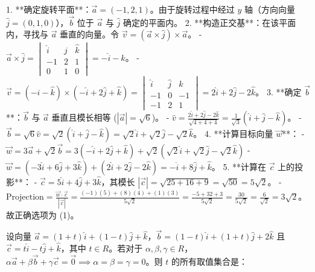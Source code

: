 \begin{questions}
\begin{solution}
1. **确定旋转平面**：$\vec{a} = (-1, 2, 1)$。由于旋转过程中经过 $y$ 轴（方向向量 $\hat{j} = (0, 1, 0)$），$\vec{b}$ 位于 $\vec{a}$ 与 $\hat{j}$ 确定的平面内。
2. **构造正交基**：在该平面内，寻找与 $\vec{a}$ 垂直的向量。令 $\vec{v} = (\vec{a} \times \hat{j}) \times \vec{a}$。
   - $\vec{a} \times \hat{j} = \begin{vmatrix} \hat{i} & \hat{j} & \hat{k} \\ -1 & 2 & 1 \\ 0 & 1 & 0 \end{vmatrix} = -\hat{i} - \hat{k}$。
   - $\vec{v} = (-\hat{i} - \hat{k}) \times (-\hat{i} + 2\hat{j} + \hat{k}) = \begin{vmatrix} \hat{i} & \hat{j} & \hat{k} \\ -1 & 0 & -1 \\ -1 & 2 & 1 \end{vmatrix} = 2\hat{i} + 2\hat{j} - 2\hat{k}$。
3. **确定 $\vec{b}$**：$\vec{b}$ 与 $\vec{a}$ 垂直且模长相等 ($|\vec{a}| = \sqrt{6}$)。
   - $\hat{v} = \frac{2\hat{i} + 2\hat{j} - 2\hat{k}}{\sqrt{4+4+4}} = \frac{1}{\sqrt{3}}(\hat{i} + \hat{j} - \hat{k})$。
   - $\vec{b} = \sqrt{6} \hat{v} = \sqrt{2}(\hat{i} + \hat{j} - \hat{k}) = \sqrt{2}\hat{i} + \sqrt{2}\hat{j} - \sqrt{2}\hat{k}$。
4. **计算目标向量 $\vec{w}$**：
   - $\vec{w} = 3\vec{a} + \sqrt{2}\vec{b} = 3(-\hat{i} + 2\hat{j} + \hat{k}) + \sqrt{2}(\sqrt{2}\hat{i} + \sqrt{2}\hat{j} - \sqrt{2}\hat{k})$
   - $\vec{w} = (-3\hat{i} + 6\hat{j} + 3\hat{k}) + (2\hat{i} + 2\hat{j} - 2\hat{k}) = -\hat{i} + 8\hat{j} + \hat{k}$。
5. **计算在 $\vec{c}$ 上的投影**：
   - $\vec{c} = 5\hat{i} + 4\hat{j} + 3\hat{k}$，其模长 $|\vec{c}| = \sqrt{25 + 16 + 9} = \sqrt{50} = 5\sqrt{2}$。
   - $\text{Projection} = \frac{\vec{w} \cdot \vec{c}}{|\vec{c}|} = \frac{(-1)(5) + (8)(4) + (1)(3)}{5\sqrt{2}} = \frac{-5 + 32 + 3}{5\sqrt{2}} = \frac{30}{5\sqrt{2}} = \frac{6}{\sqrt{2}} = 3\sqrt{2}$。
故正确选项为 (1)。
\end{solution}

\question
设向量 $\vec{a} = (1+t)\hat{i} + (1-t)\hat{j} + \hat{k}$，$\vec{b} = (1-t)\hat{i} + (1+t)\hat{j} + 2\hat{k}$ 且 $\vec{c} = t\hat{i} - t\hat{j} + \hat{k}$，其中 $t \in R$。若对于 $\alpha, \beta, \gamma \in R$，$\alpha\vec{a} + \beta\vec{b} + \gamma\vec{c} = \vec{0} \implies \alpha = \beta = \gamma = 0$。则 $t$ 的所有取值集合是：


\end{questions}
